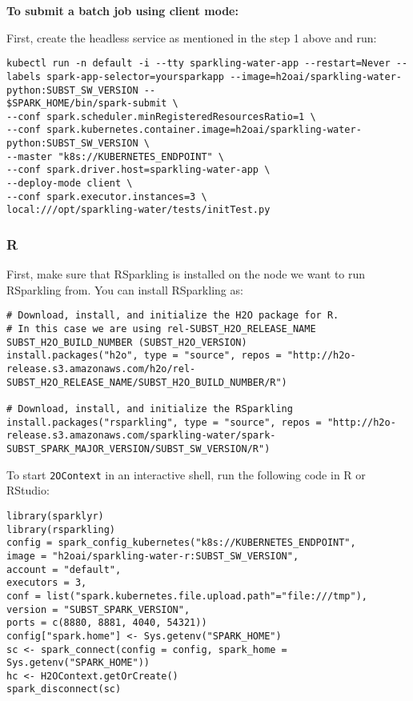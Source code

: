 \textbf{To submit a batch job using client mode:}

First, create the headless service as mentioned in the step 1 above and run:

\begin{lstlisting}[style=Bash]
kubectl run -n default -i --tty sparkling-water-app --restart=Never --labels spark-app-selector=yoursparkapp --image=h2oai/sparkling-water-python:SUBST_SW_VERSION --
$SPARK_HOME/bin/spark-submit \
--conf spark.scheduler.minRegisteredResourcesRatio=1 \
--conf spark.kubernetes.container.image=h2oai/sparkling-water-python:SUBST_SW_VERSION \
--master "k8s://KUBERNETES_ENDPOINT" \
--conf spark.driver.host=sparkling-water-app \
--deploy-mode client \
--conf spark.executor.instances=3 \
local:///opt/sparkling-water/tests/initTest.py
\end{lstlisting}

\subsubsection{R}

First, make sure that RSparkling is installed on the node we want to run RSparkling from.
You can install RSparkling as:

\begin{lstlisting}[style=R]
# Download, install, and initialize the H2O package for R.
# In this case we are using rel-SUBST_H2O_RELEASE_NAME SUBST_H2O_BUILD_NUMBER (SUBST_H2O_VERSION)
install.packages("h2o", type = "source", repos = "http://h2o-release.s3.amazonaws.com/h2o/rel-SUBST_H2O_RELEASE_NAME/SUBST_H2O_BUILD_NUMBER/R")

# Download, install, and initialize the RSparkling
install.packages("rsparkling", type = "source", repos = "http://h2o-release.s3.amazonaws.com/sparkling-water/spark-SUBST_SPARK_MAJOR_VERSION/SUBST_SW_VERSION/R")
\end{lstlisting}


To start \texttt{2OContext} in an interactive shell, run the following code in R or RStudio:

\begin{lstlisting}[style=R]
library(sparklyr)
library(rsparkling)
config = spark_config_kubernetes("k8s://KUBERNETES_ENDPOINT",
image = "h2oai/sparkling-water-r:SUBST_SW_VERSION",
account = "default",
executors = 3,
conf = list("spark.kubernetes.file.upload.path"="file:///tmp"),
version = "SUBST_SPARK_VERSION",
ports = c(8880, 8881, 4040, 54321))
config["spark.home"] <- Sys.getenv("SPARK_HOME")
sc <- spark_connect(config = config, spark_home = Sys.getenv("SPARK_HOME"))
hc <- H2OContext.getOrCreate()
spark_disconnect(sc)
\end{lstlisting}


